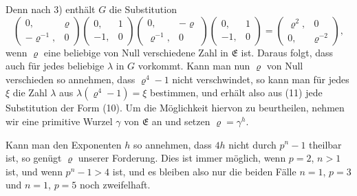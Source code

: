 Denn nach 3) enth\"alt $G$ die Substitution
\[
\begin{pmatrix} 0, & \varrho \\ -\varrho^{-1}, & 0 \end{pmatrix}\begin{pmatrix} 0, & 1 \\ -1, & 0 \end{pmatrix}\begin{pmatrix} 0, & -\varrho \\ \varrho^{-1}, & 0 \end{pmatrix}\begin{pmatrix} 0, & 1 \\ -1, & 0 \end{pmatrix} = \begin{pmatrix} \varrho^2, & 0 \\ 0, & \varrho^{-2} \end{pmatrix},
\]
wenn $\varrho$ eine beliebige von Null verschiedene Zahl in $\mathfrak{E}$ ist. Daraus folgt, dass auch
f\"ur jedes beliebige $\lambda$ in $G$ vorkommt. Kann man nun $\varrho$ von Null verschieden so annehmen, dass $\varrho^4-1$ nicht verschwindet, so kann man f\"ur jedes $\xi$ die Zahl $\lambda$ aus $\lambda(\varrho^4-1)=\xi$ bestimmen, und erh\"alt also aus (11) jede Substitution der Form (10). Um die M\"oglichkeit hiervon zu beurtheilen, nehmen wir eine primitive Wurzel $\gamma$ von $\mathfrak{E}$ an und setzen $\varrho=\gamma^h$.

Kann man den Exponenten $h$ so annehmen, dass $4h$ nicht durch $p^n-1$ theilbar ist, so gen\"ugt $\varrho$ unserer Forderung. Dies ist immer m\"oglich, wenn $p=2$, $n>1$ ist, und wenn $p^n-1>4$ ist, und es bleiben also nur die beiden F\"alle $n=1$, $p=3$ und $n=1$, $p=5$ noch zweifelhaft.
